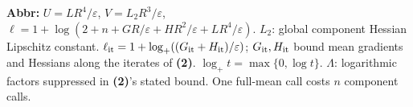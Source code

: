 \begin{table}[tp]
\begin{threeparttable}
\begin{tabularx}{\linewidth}{@{}>{\raggedright\arraybackslash}p{0.20\linewidth}>{\raggedright\arraybackslash}p{0.28\linewidth}>{\raggedright\arraybackslash}p{0.30\linewidth}>{\raggedright\arraybackslash}X@{}}
\bottomrule
\end{tabularx}
\begin{tablenotes}[flushleft]\footnotesize
\item[] \textbf{Abbr:} $U=LR^4/\varepsilon$, $V=L_2R^3/\varepsilon$, $\ell=1+\log(2+n+GR/\varepsilon+HR^2/\varepsilon+LR^4/\varepsilon)$. $L_2$: global component Hessian Lipschitz constant. $\ell_{\rm it}=1+\log_+((G_{\rm it}+H_{\rm it})/\varepsilon)$; $G_{\rm it},H_{\rm it}$ bound mean gradients and Hessians along the iterates of \textbf{(2)}. $\log_+t=\max\{0,\log t\}$. $\Lambda$: logarithmic factors suppressed in \textbf{(2)}'s stated bound. One full-mean call costs $n$ component calls.
\end{tablenotes}
\end{threeparttable}
\end{table}
\clearpage
